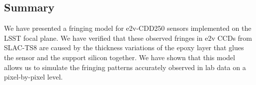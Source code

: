 \documentclass[twocolumn]{aastex63} %
\begin{document}
\begin{CJK*}{UTF8}{gbsn}




\section{Summary}
We have presented a fringing model for e2v-CDD250 sensors implemented on the LSST focal plane. We have verified that these observed fringes in e2v CCDs from SLAC-TS8 are caused by the thickness variations of the epoxy layer that glues the sensor and the support silicon together. We have shown that this model allows us to simulate the fringing patterns accurately observed in lab data on a pixel-by-pixel level. 


\end{CJK*}
\end{document}
